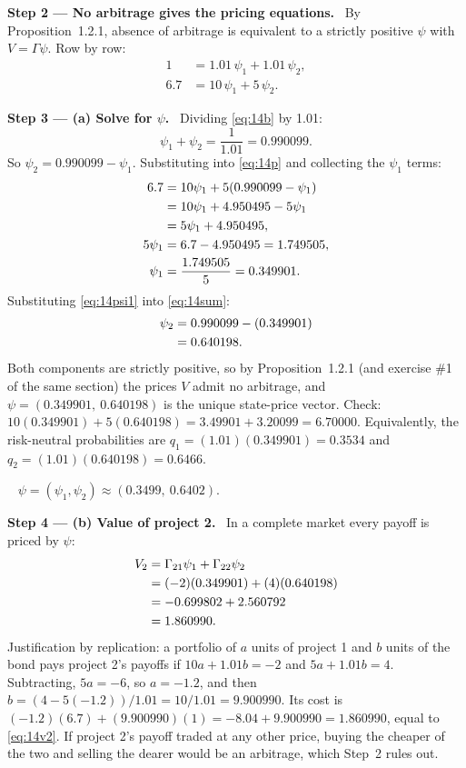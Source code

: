 \documentclass[11pt,a4paper]{article}
\numberwithin{equation}{section}
\newcommand{\step}[2]{\par\medskip\noindent\textbf{Step #1 --- #2.}~}
\newcommand{\answer}[1]{\par\smallskip\noindent\fbox{\textbf{Answer #1.}}~}
\begin{document}
\step{2}{No arbitrage gives the pricing equations} By Proposition~1.2.1, absence of arbitrage is
equivalent to a strictly positive $\psi$ with $V=\Gamma\psi$. Row by row:
\begin{align}
  1   &= 1.01\,\psi_1 + 1.01\,\psi_2, \label{eq:14b}\\
  6.7 &= 10\,\psi_1 + 5\,\psi_2. \label{eq:14p}
\end{align}

\step{3}{(a) Solve for $\psi$} Dividing \eqref{eq:14b} by 1.01:
\begin{equation}\label{eq:14sum}
  \psi_1 + \psi_2 = \frac{1}{1.01} = 0.990099.
\end{equation}
So $\psi_2 = 0.990099-\psi_1$. Substituting into \eqref{eq:14p} and collecting the $\psi_1$ terms:
\begin{align}
  6.7 &= 10\psi_1 + 5(0.990099-\psi_1) \notag\\
      &= 10\psi_1 + 4.950495 - 5\psi_1 \notag\\
      &= 5\psi_1 + 4.950495, \notag\\
  5\psi_1 &= 6.7-4.950495 = 1.749505, \notag\\
  \psi_1 &= \frac{1.749505}{5} = 0.349901. \label{eq:14psi1}
\end{align}
Substituting \eqref{eq:14psi1} into \eqref{eq:14sum}:
\begin{align}
  \psi_2 &= 0.990099 - (0.349901) \notag\\
         &= 0.640198. \label{eq:14psi2}
\end{align}
Both components are strictly positive, so by Proposition~1.2.1 (and exercise \#1 of the same
section) the prices $V$ admit no arbitrage, and $\psi=(0.349901,\ 0.640198)$ is the unique
state-price vector. Check: $10(0.349901)+5(0.640198)=3.49901+3.20099=6.70000$. Equivalently,
the risk-neutral probabilities are $q_1=(1.01)(0.349901)=0.3534$ and $q_2=(1.01)(0.640198)=0.6466$.

\answer{(a)} $\psi=(\psi_1,\psi_2)\approx(0.3499,\ 0.6402)$.

\step{4}{(b) Value of project 2} In a complete market every payoff is priced by $\psi$:
\begin{align}
  V_2 &= \Gamma_{21}\psi_1 + \Gamma_{22}\psi_2 \notag\\
      &= (-2)(0.349901) + (4)(0.640198) \notag\\
      &= -0.699802 + 2.560792 \notag\\
      &= 1.860990. \label{eq:14v2}
\end{align}
Justification by replication: a portfolio of $a$ units of project 1 and $b$ units of the bond
pays project 2's payoffs if $10a+1.01b=-2$ and $5a+1.01b=4$. Subtracting, $5a=-6$, so $a=-1.2$,
and then $b=(4-5(-1.2))/1.01=10/1.01=9.900990$. Its cost is
$(-1.2)(6.7)+(9.900990)(1)=-8.04+9.900990=1.860990$, equal to \eqref{eq:14v2}. If project 2's
payoff traded at any other price, buying the cheaper of the two and selling the dearer would be
an arbitrage, which Step~2 rules out.
\end{document}
